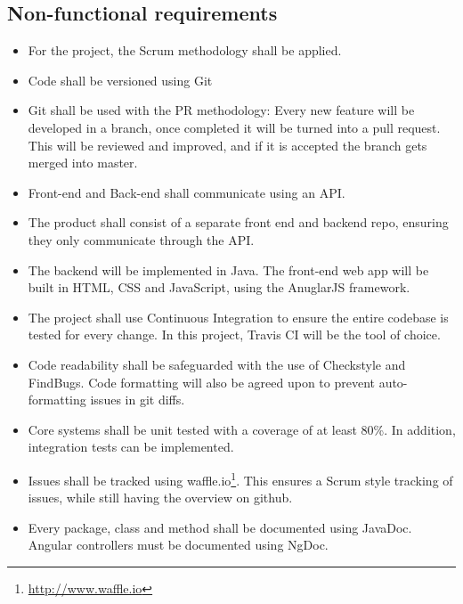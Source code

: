 \subsection{Non-functional requirements}
\begin{itemize}

\item For the project, the Scrum methodology shall be applied.

\item Code shall be versioned using Git

\item Git shall be used with the PR methodology: Every new feature will be developed in a branch, once completed it will be turned into a pull request. This will be reviewed and improved, and if it is accepted the branch gets merged into master.

\item Front-end and Back-end shall communicate using an API.

\item The product shall consist of a separate front end and backend repo, ensuring they only communicate through the API.

\item The backend will be implemented in Java. The front-end web app will be built in \gls{HTML}, \gls{CSS} and \gls{JavaScript}, using the \gls{AnuglarJS} framework. 

\item The project shall use Continuous Integration to ensure the entire codebase is tested for every change. In this project, \gls{Travis CI} will be the tool of choice.

\item Code readability shall be safeguarded with the use of Checkstyle and FindBugs. Code formatting will also be agreed upon to prevent auto-formatting issues in git diffs.

\item Core systems shall be unit tested with a coverage of at least 80\%. In addition, integration tests can be implemented.

\item Issues shall be tracked using waffle.io\footnote{\url{http://www.waffle.io}}. This ensures a Scrum style tracking of issues, while still having the overview on github.

\item Every package, class and method shall be documented using JavaDoc. Angular controllers must be documented using NgDoc. 

\end{itemize}
